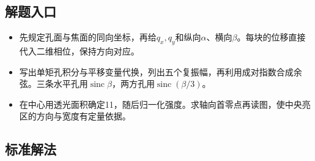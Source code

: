 \documentclass[UTF8,fontset=fandol,a4paper,11pt]{ctexart}
\begin{document}
\subsection*{解题入口}

\begin{itemize}
\item 先规定孔面与焦面的同向坐标，再给$q_x,q_y$和纵向$\alpha$、横向$\beta$。每块的位移直接代入二维相位，保持方向对应。
\item 写出单矩孔积分与平移变量代换，列出五个复振幅，再利用成对指数合成余弦。三条水平孔用$\operatorname{sinc}\beta$，两方孔用$\operatorname{sinc}(\beta/3)$。
\item 在中心用透光面积确定11，随后归一化强度。求轴向首零点再读图，使中央亮区的方向与宽度有定量依据。
\end{itemize}



\subsection*{标准解法}
\end{document}
